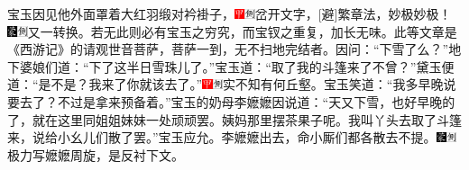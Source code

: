 宝玉因见他外面罩着大红羽缎对衿褂子，{{\includegraphics[width=3mm]{../Images/00002}\includegraphics[width=3mm]{../Images/00011}\footnotesize \kaishu 岔开文字，{[}避{]}繁章法，妙极妙极！　}\includegraphics[width=3mm]{../Images/00006}\includegraphics[width=3mm]{../Images/00011}\footnotesize \kaishu 又一转换。若无此则必有宝玉之穷究，而宝钗之重复，加长无味。此等文章是《西游记》的请观世音菩萨，菩萨一到，无不扫地完结者。}因问：“下雪了么？”地下婆娘们道：“下了这半日雪珠儿了。”宝玉道：“取了我的斗篷来了不曾？”黛玉便道：“是不是？我来了你就该去了。”{\includegraphics[width=3mm]{../Images/00002}\includegraphics[width=3mm]{../Images/00011}\footnotesize \kaishu 实不知有何丘壑。}宝玉笑道：“我多早晚说要去了？不过是拿来预备着。”宝玉的奶母李嬷嬷因说道：“天又下雪，也好早晚的了，就在这里同姐姐妹妹一处顽顽罢。姨妈那里摆茶果子呢。我叫丫头去取了斗篷来，说给小幺儿们散了罢。”宝玉应允。李嬷嬷出去，命小厮们都各散去不提。{\includegraphics[width=3mm]{../Images/00006}\includegraphics[width=3mm]{../Images/00011}\footnotesize \kaishu 极力写嬷嬷周旋，是反衬下文。}

